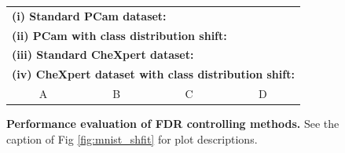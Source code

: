 \documentclass[10pt,letterpaper]{article}
\begin{document}
\begin{figure}[h!]
	
	\begin{tabular}{cccc}
		\multicolumn{4}{l}{\bf (i) Standard PCam dataset:}\\		
		\multicolumn{4}{l}{\bf (ii) PCam with class distribution shift:}\\		
		\multicolumn{4}{l}{\bf (iii) Standard CheXpert dataset:}\\	
		\multicolumn{4}{l}{\bf (iv) CheXpert dataset with class distribution shift:}\\	
		A & B & C & D
	\end{tabular}
	\caption{{\bf Performance evaluation of FDR controlling methods.} See the caption of Fig \ref{fig:mnist_shfit} for plot descriptions. }
	\label{fig:I}
\end{figure} 
\end{document}

